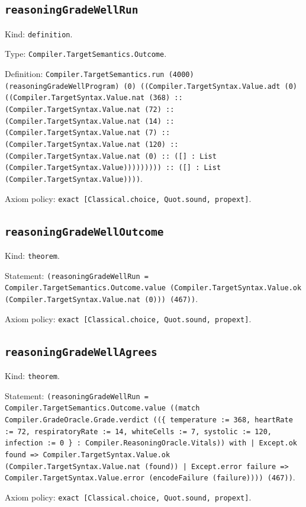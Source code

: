 \documentclass[11pt]{article}
\begin{document}
\subsection*{\texttt{reasoningGradeWellRun}}
\noindent Kind: \texttt{definition}.\par
\noindent Type: \texttt{Compiler.TargetSemantics.Outcome}.\par
\noindent Definition: \texttt{Compiler.TargetSemantics.run (4000) (reasoningGradeWellProgram) (0) ((Compiler.TargetSyntax.Value.adt (0) ((Compiler.TargetSyntax.Value.nat (368) :: (Compiler.TargetSyntax.Value.nat (72) :: (Compiler.TargetSyntax.Value.nat (14) :: (Compiler.TargetSyntax.Value.nat (7) :: (Compiler.TargetSyntax.Value.nat (120) :: (Compiler.TargetSyntax.Value.nat (0) :: ([] : List (Compiler.TargetSyntax.Value))))))))) :: ([] : List (Compiler.TargetSyntax.Value))))}.\par
\noindent Axiom policy: \texttt{exact [Classical.choice, Quot.sound, propext]}.\par
\subsection*{\texttt{reasoningGradeWellOutcome}}
\noindent Kind: \texttt{theorem}.\par
\noindent Statement: \texttt{(reasoningGradeWellRun = Compiler.TargetSemantics.Outcome.value (Compiler.TargetSyntax.Value.ok (Compiler.TargetSyntax.Value.nat (0))) (467))}.\par
\noindent Axiom policy: \texttt{exact [Classical.choice, Quot.sound, propext]}.\par
\subsection*{\texttt{reasoningGradeWellAgrees}}
\noindent Kind: \texttt{theorem}.\par
\noindent Statement: \texttt{(reasoningGradeWellRun = Compiler.TargetSemantics.Outcome.value ((match Compiler.GradeOracle.Grade.verdict ((\{ temperature := 368, heartRate := 72, respiratoryRate := 14, whiteCells := 7, systolic := 120, infection := 0 \} : Compiler.ReasoningOracle.Vitals)) with | Except.ok found => Compiler.TargetSyntax.Value.ok (Compiler.TargetSyntax.Value.nat (found)) | Except.error failure => Compiler.TargetSyntax.Value.error (encodeFailure (failure)))) (467))}.\par
\noindent Axiom policy: \texttt{exact [Classical.choice, Quot.sound, propext]}.\par
\end{document}
